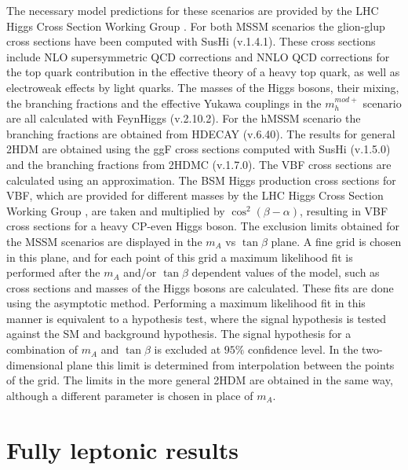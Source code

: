 The necessary model predictions for these scenarios are provided by the LHC Higgs Cross Section Working Group \cite{bsmhiggsxsecs}. For both MSSM scenarios the glion-glup cross sections have been computed with SusHi (v.1.4.1)\cite{Harlander:2012pb}. These cross sections include NLO supersymmetric QCD corrections and NNLO QCD corrections for the top quark contribution in the effective theory of a heavy top quark, as well as electroweak effects by light quarks. The masses of the Higgs bosons, their mixing, the branching fractions and the effective Yukawa couplings in the $m_{h}^{mod+}$ scenario are all calculated with FeynHiggs (v.2.10.2)\cite{Heinemeyer:1998yj, Heinemeyer:1998np, Degrassi:2002fi, Frank:2006yh, Hahn:2013ria}. For the hMSSM scenario the branching fractions are obtained from HDECAY (v.6.40)\cite{Djouadi:1997yw, Djouadi:2006bz}. The results for general 2HDM are obtained using the ggF cross sections computed with SusHi (v.1.5.0) and the branching fractions from 2HDMC (v.1.7.0)\cite{Rathsman:2011yv}. The VBF cross sections are calculated using an approximation. The BSM Higgs production cross sections for VBF, which are provided for different masses by the LHC Higgs Cross Section Working Group \cite{bsmhiggsxsecs2}, are taken and multiplied by $\cos^{2}(\beta-\alpha)$, resulting in VBF cross sections for a heavy CP-even Higgs boson.\newline
The exclusion limits obtained for the MSSM scenarios are displayed in the $m_{A}$ vs $\tan\beta$ plane. A fine grid is chosen in this plane, and for each point of this grid a maximum likelihood fit is performed after the $m_{A}$ and/or $\tan\beta$ dependent values of the model, such as cross sections and masses of the Higgs bosons are calculated. These fits are done using the asymptotic method. Performing a maximum likelihood fit in this manner is equivalent to a hypothesis test, where the signal hypothesis is tested against the SM and background hypothesis. The signal hypothesis for a combination of $m_{A}$ and $\tan\beta$ is excluded at $95\%$ confidence level. In the two-dimensional plane this limit is determined from interpolation between the points of the grid. The limits in the more general 2HDM are obtained in the same way, although a different parameter is chosen in place of $m_{A}$.



\section{Fully leptonic results}
